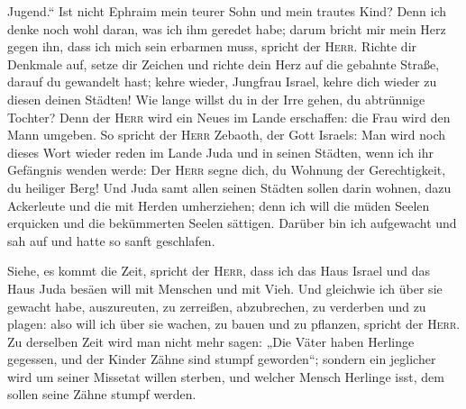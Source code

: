 Jugend.``  Ist nicht Ephraim mein teurer Sohn und mein
trautes Kind? Denn ich denke noch wohl daran, was ich ihm geredet habe;
darum bricht mir mein Herz gegen ihn, dass ich mich sein erbarmen muss,
spricht der \textsc{Herr}.  Richte dir Denkmale auf,
setze dir Zeichen und richte dein Herz auf die gebahnte Straße, darauf
du gewandelt hast; kehre wieder, Jungfrau Israel, kehre dich wieder zu
diesen deinen Städten!  Wie lange willst du in der Irre
gehen, du abtrünnige Tochter? Denn der \textsc{Herr} wird ein Neues im
Lande erschaffen: die Frau wird den Mann umgeben.  So
spricht der \textsc{Herr} Zebaoth, der Gott Israels: Man wird noch
dieses Wort wieder reden im Lande Juda und in seinen Städten, wenn ich
ihr Gefängnis wenden werde: Der \textsc{Herr} segne dich, du Wohnung der
Gerechtigkeit, du heiliger Berg!  Und Juda samt allen
seinen Städten sollen darin wohnen, dazu Ackerleute und die mit Herden
umherziehen;  denn ich will die müden Seelen erquicken
und die bekümmerten Seelen sättigen.  Darüber bin ich
aufgewacht und sah auf und hatte so sanft geschlafen.

 Siehe, es kommt die Zeit, spricht der \textsc{Herr},
dass ich das Haus Israel und das Haus Juda besäen will mit Menschen und
mit Vieh.  Und gleichwie ich über sie gewacht habe,
auszureuten, zu zerreißen, abzubrechen, zu verderben und zu plagen: also
will ich über sie wachen, zu bauen und zu pflanzen, spricht der
\textsc{Herr}.  Zu derselben Zeit wird man nicht mehr
sagen: „Die Väter haben Herlinge gegessen, und der Kinder Zähne sind
stumpf geworden``;  sondern ein jeglicher wird um seiner
Missetat willen sterben, und welcher Mensch Herlinge isst, dem sollen
seine Zähne stumpf werden.

